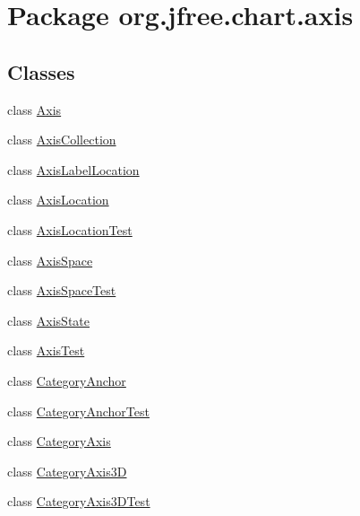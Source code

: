 \hypertarget{namespaceorg_1_1jfree_1_1chart_1_1axis}{}\section{Package org.\+jfree.\+chart.\+axis}
\label{namespaceorg_1_1jfree_1_1chart_1_1axis}
\subsection*{Classes}
\begin{DoxyCompactItemize}
\item 
class \mbox{\hyperlink{classorg_1_1jfree_1_1chart_1_1axis_1_1_axis}{Axis}}
\item 
class \mbox{\hyperlink{classorg_1_1jfree_1_1chart_1_1axis_1_1_axis_collection}{Axis\+Collection}}
\item 
class \mbox{\hyperlink{classorg_1_1jfree_1_1chart_1_1axis_1_1_axis_label_location}{Axis\+Label\+Location}}
\item 
class \mbox{\hyperlink{classorg_1_1jfree_1_1chart_1_1axis_1_1_axis_location}{Axis\+Location}}
\item 
class \mbox{\hyperlink{classorg_1_1jfree_1_1chart_1_1axis_1_1_axis_location_test}{Axis\+Location\+Test}}
\item 
class \mbox{\hyperlink{classorg_1_1jfree_1_1chart_1_1axis_1_1_axis_space}{Axis\+Space}}
\item 
class \mbox{\hyperlink{classorg_1_1jfree_1_1chart_1_1axis_1_1_axis_space_test}{Axis\+Space\+Test}}
\item 
class \mbox{\hyperlink{classorg_1_1jfree_1_1chart_1_1axis_1_1_axis_state}{Axis\+State}}
\item 
class \mbox{\hyperlink{classorg_1_1jfree_1_1chart_1_1axis_1_1_axis_test}{Axis\+Test}}
\item 
class \mbox{\hyperlink{classorg_1_1jfree_1_1chart_1_1axis_1_1_category_anchor}{Category\+Anchor}}
\item 
class \mbox{\hyperlink{classorg_1_1jfree_1_1chart_1_1axis_1_1_category_anchor_test}{Category\+Anchor\+Test}}
\item 
class \mbox{\hyperlink{classorg_1_1jfree_1_1chart_1_1axis_1_1_category_axis}{Category\+Axis}}
\item 
class \mbox{\hyperlink{classorg_1_1jfree_1_1chart_1_1axis_1_1_category_axis3_d}{Category\+Axis3D}}
\item 
class \mbox{\hyperlink{classorg_1_1jfree_1_1chart_1_1axis_1_1_category_axis3_d_test}{Category\+Axis3\+D\+Test}}

\end{DoxyCompactItemize}
